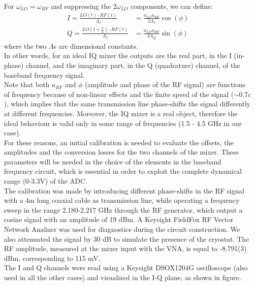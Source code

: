 \documentclass[12pt]{article}
\begin{document}
For $\omega_{LO} = \omega_{RF}$ and suppressing the $2\omega_{LO}$ components, we can define:
\begin{align}
I = \frac{LO(t) \cdot RF(t) }{\Lambda_I} &= \frac{a_{LO}a_{RF}}{2 \Lambda_I}\cos(\phi) \\
Q = \frac{LO(t+\frac{\pi}{2}) \cdot RF(t)}{\Lambda_I} &= \frac{a_{LO}a_{RF}}{ 2 \Lambda_Q}\sin(\phi)
\end{align}
where the two $\Lambda$s are dimensional constants.\\
In other words, for an ideal IQ mixer the outputs are the real part, in the I (in-phase) channel, and the imaginary part, in the Q (quadrature) channel, of the baseband frequency signal.\\
Note that both $a_{RF}$ and $\phi$ (amplitude and phase of the RF signal) are functions of frequency because of non-linear effects and the finite speed of the signal ($\sim 0.7c$), which implies that the same transmission line phase-shifts the signal differently at different frequencies. Moreover, the IQ mixer is a real object, therefore the ideal behaviour is valid only in some range of frequencies (1.5 - 4.5 GHz in our case).\\
For these reasons, an initial calibration is needed to evaluate the offsets, the amplitudes and the conversion losses for the two channels of the mixer. These parameters will be needed in the choice of the elements in the baseband frequency circuit, which is essential in order to exploit the complete dynamical range (0-3.3V) of the ADC.\\
The calibration was made by introducing different phase-shifts in the RF signal with a 4m long coaxial cable as transmission line, while operating a frequency sweep in the range 2.180-2.217 GHz through the RF generator, which output a cosine signal with an amplitude of 19 dBm. A Keysight FieldFox RF Vector Network Analizer was used for diagnostics during the circuit construction.
We also attenuated the signal by 30 dB to simulate the presence of the cryostat. The RF amplitude, measured at the mixer input with the VNA, is equal to -8.791(3) dBm, corresponding to 115 mV.\\
The I and Q channels were read using a Keysight DSOX1204G oscilloscope (also used in all the other cases) and visualized in the I-Q plane, as shown in figure.
\end{document}

